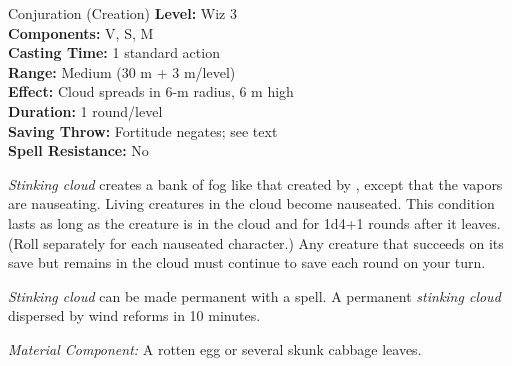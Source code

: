 {Conjuration (Creation)}
{
	\textbf{Level:}
	Wiz 3\\
	\textbf{Components:}
	V, S, M\\
	\textbf{Casting Time:}
	1 standard action\\
	\textbf{Range:}
	Medium (30 m + 3 m/level)\\
	\textbf{Effect:}
	Cloud spreads in 6-m radius, 6 m high\\
	\textbf{Duration:}
	1 round/level\\
	\textbf{Saving Throw:}
	Fortitude negates; see text\\
	\textbf{Spell Resistance:}
	No\\
}
{
	\emph{Stinking cloud} creates a bank of fog like that created by , except that the vapors are nauseating. Living creatures in the cloud become nauseated. This condition lasts as long as the creature is in the cloud and for 1d4+1 rounds after it leaves. (Roll separately for each nauseated character.) Any creature that succeeds on its save but remains in the cloud must continue to save each round on your turn.

	\emph{Stinking cloud} can be made permanent with a  spell. A permanent \emph{stinking cloud} dispersed by wind reforms in 10 minutes.

	\textit{Material Component:}
	A rotten egg or several skunk cabbage leaves.

}
